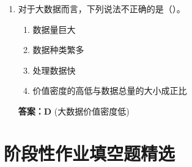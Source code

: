 \documentclass[12pt, a4paper]{article}
\begin{document}
\begin{enumerate}[label=\arabic*.]
    \item 对于大数据而言，下列说法不正确的是（\quad）。
    \begin{enumerate}
        \item 数据量巨大
        \item 数据种类繁多
        \item 处理数据快
        \item 价值密度的高低与数据总量的大小成正比
    \end{enumerate}
    \textbf{答案：D} (大数据价值密度低)
\end{enumerate}

\section{阶段性作业填空题精选}
\end{document}
